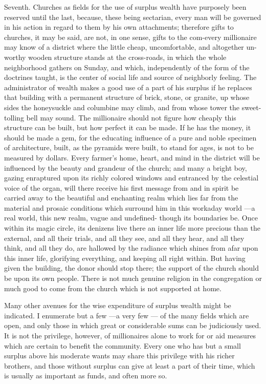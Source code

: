 \documentclass[11pt,openany]{book}
\begin{document}
Seventh. Churches as fields for the use of surplus wealth have purposely been reserved until the last, because, these being sectarian, every man will be governed in his action in regard to them by his own attachments; therefore gifts to churches, it may be said, are not, in one sense, gifts to the com-every millionaire may know of a district where the little cheap, uncomfortable, and altogether un- worthy wooden structure stands at the cross-roads, in which the whole neighborhood gathers on Sunday, and which, independently of the form of the doctrines taught, is the center of social life and source of neighborly feeling. The administrator of wealth makes a good use of a part of his surplus if he replaces that building with a permanent structure of brick, stone, or granite, up whose sides the honeysuckle and columbine may climb, and from whose tower the sweet-tolling bell may sound. The millionaire should not figure how cheaply this structure can be built, but how perfect it can be made. If he has the money, it should be made a gem, for the educating influence of a pure and noble specimen of architecture, built, as the pyramids were built, to stand for ages, is not to be measured by dollars. Every farmer's home, heart, and mind in the district will be influenced by the beauty and grandeur of the church; and many a bright boy, gazing enraptured upon its richly colored windows and entranced by the celestial voice of the organ, will there receive his first message from and in spirit be carried away to the beautiful and enchanting realm which lies far from the material and prosaic conditions which surround him in this workaday world ---a real world, this new realm, vague and undefined- though its boundaries be. Once within its magic circle, its denizens live there an inner life more precious than the external, and all their trials, and all they see, and all they hear, and all they think, and all they do, are hallowed by the radiance which shines from afar upon this inner life, glorifying everything, and keeping all right within. But having given the building, the donor should stop there; the support of the church should be upon its own people. There is not much genuine religion in the congregation or much good to come from the church which is not supported at home.

Many other avenues for the wise expenditure of surplus wealth might be indicated. I enumerate but a few ---a very few --- of the many fields which are open, and only those in which great or considerable sums can be judiciously used. It is not the privilege, however, of millionaires alone to work for or aid measures which are certain to benefit the community. Every one who has but a small surplus above his moderate wants may share this privilege with his richer brothers, and those without surplus can give at least a part of their time, which is usually as important as funds, and often more so.
\end{document}
